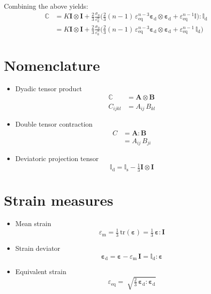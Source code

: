 \documentclass[times,namecite]{goose-article}
\begin{document}
Combining the above yields:
\begin{align}
\mathbb{C}
&= K \bm{I} \otimes \bm{I} +
\frac{2}{3} \frac{\sigma_0}{\varepsilon_0^n}
\bigg(
  \tfrac{2}{3} (n-1) \, \varepsilon_\mathrm{eq}^{n-3}
  \bm{\varepsilon}_\mathrm{d} \otimes \bm{\varepsilon}_\mathrm{d}
  + \varepsilon_\mathrm{eq}^{n-1} \mathbb{I}
\bigg) : \mathbb{I}_\mathrm{d} \\
&= K \bm{I} \otimes \bm{I} +
\frac{2}{3} \frac{\sigma_0}{\varepsilon_0^n}
\bigg(
  \tfrac{2}{3} (n-1) \, \varepsilon_\mathrm{eq}^{n-3}
  \bm{\varepsilon}_\mathrm{d} \otimes \bm{\varepsilon}_\mathrm{d}
  + \varepsilon_\mathrm{eq}^{n-1} \, \mathbb{I}_\mathrm{d}
\bigg)
\end{align}

\appendix
\vfill\newpage

\section{Nomenclature}
\label{sec:ap:nomenclature}

\begin{itemize}
%
\item Dyadic tensor product
\begin{align}
  \mathbb{C} &= \bm{A} \otimes \bm{B} \\
  C_{ijkl}   &= A_{ij} \,      B_{kl}
\end{align}
%
\item Double tensor contraction
\begin{align}
  C &= \bm{A} : \bm{B} \\
    &= A_{ij} \, B_{ji}
\end{align}
%
\item Deviatoric projection tensor
\begin{equation}
  \mathbb{I}_\mathrm{d}
  = \mathbb{I}_\mathrm{s} - \tfrac{1}{3} \bm{I} \otimes \bm{I}
\end{equation}
%
\end{itemize}

\section{Strain measures}
\label{sec:ap:strain}

\begin{itemize}
%
\item Mean strain
\begin{equation}
  \varepsilon_\mathrm{m}
  = \tfrac{1}{3} \, \mathrm{tr} ( \bm{\varepsilon} )
  = \tfrac{1}{3} \, \bm{\varepsilon} : \bm{I}
\end{equation}
%
\item Strain deviator
\begin{equation}
  \bm{\varepsilon}_\mathrm{d}
  = \bm{\varepsilon} - \varepsilon_\mathrm{m} \, \bm{I}
  = \mathbb{I}_\mathrm{d} : \bm{\varepsilon}
\end{equation}
%
\item Equivalent strain
\begin{equation}
  \varepsilon_\mathrm{eq}
  = \; \sqrt{
    \tfrac{2}{3} \, \bm{\varepsilon}_\mathrm{d} : \bm{\varepsilon}_\mathrm{d}
  }
\end{equation}
%
\end{itemize}
\end{document}
